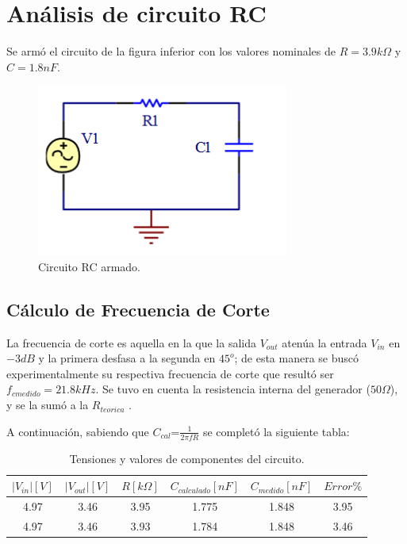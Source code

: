



\onehalfspacing



\section{Análisis de circuito RC}

Se armó el circuito de la figura inferior con los valores nominales de $R=3.9k\Omega$ y $C=1.8nF$.
\begin{figure}[h!]
\centering
\includegraphics[scale=0.5]{rcCircuito.png}
\caption{Circuito RC armado.}
\label{fig:RC}
\end{figure}

\subsection{Cálculo de Frecuencia de Corte}

La frecuencia de corte es aquella en la que la salida $V_{out}$ atenúa la entrada $V_{in}$ en $-3dB$ y la primera desfasa a la segunda en $45^o$; de esta manera
se buscó experimentalmente su respectiva frecuencia de corte que resultó ser $f_{cmedido}=21.8kHz$. Se tuvo en cuenta la resistencia interna
del generador ($50\Omega$), y se la sumó a la $R_{teorica}$ .

A continuación, sabiendo que $C_{cal}\text{=}\frac{1}{2\pi fR}$ se completó la siguiente tabla:

\begin{table}[!htb]
\centering
\begin{tabular}{|c|c|c|c|c|c|}
\hline 
$|V_{in}|[V]$ & $|V_{out}|[V]$ & $R[k\Omega]$ & $C_{calculado}[nF]$ & $C_{medido}[nF]$ & $Error\%$\\
\hline 
\hline 
4.97 & 3.46 & 3.95 & 1.775 & 1.848 & 3.95\\
\hline 
4.97 & 3.46 & 3.93 & 1.784 & 1.848 & 3.46\\
\hline 
\end{tabular}
\caption{Tensiones y valores de componentes del circuito.}
\end{table}

